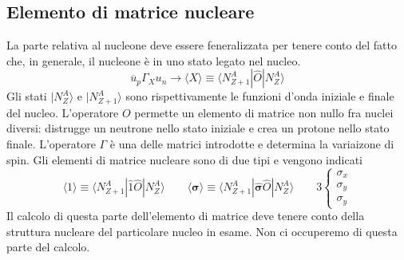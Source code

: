 \subsection{Elemento di matrice nucleare}
La parte relativa al nucleone deve essere feneralizzata per tenere conto del fatto che, in generale, il nucleone è in uno stato legato nel nucleo.
$$
\overline{u}_p \Gamma_X u_n \to \langle X \rangle \equiv \langle N^A_{Z+1} | \hat{O} | N^A_Z \rangle
$$
Gli stati $| N^A_Z \rangle$ e $| N^A_{Z+1} \rangle$ sono rispettivamente le funzioni d'onda iniziale e finale del nucleo. L'operatore $O$ permette un elemento di matrice non nullo fra nuclei diversi: distrugge un neutrone nello stato iniziale e crea un protone nello stato finale. L'operatore $\Gamma$ è una delle matrici introdotte e determina la variaizone di spin. Gli elementi di matrice nucleare sono di due tipi e vengono indicati
$$
\langle 1 \rangle \equiv \langle N^A_{Z+1} | \hat{1} \hat{O} | N^A_Z \rangle \qquad \langle \boldsymbol{\sigma} \rangle \equiv \langle N^A_{Z+1} | \hat{\boldsymbol{\sigma}} \hat{O} | N^A_Z \rangle \qquad 3 \begin{cases} \sigma_x \\ \sigma_y \\ \sigma_y \end{cases}
$$
Il calcolo di questa parte dell'elemento di matrice deve tenere conto della struttura nucleare del particolare nucleo in esame. Non ci occuperemo di questa parte del calcolo.
